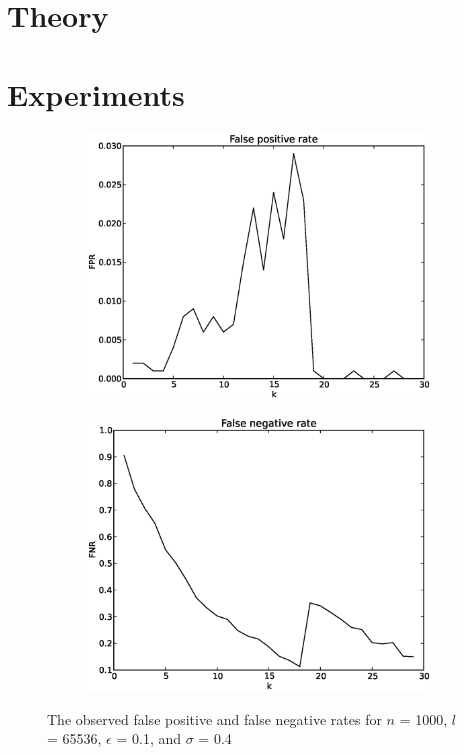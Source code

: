 \documentclass[a4paper,11pt]{article}
\begin{document}
\section{Theory} %




\section{Experiments}
\begin{figure}[H]
\centering
\begin{subfigure}{.5\textwidth}
  \centering
  \includegraphics[width=.95\linewidth]{FPR1}
\end{subfigure}%
\begin{subfigure}{.5\textwidth}
  \centering
  \includegraphics[width=.95\linewidth]{FNR1}
\end{subfigure}
\caption{The observed false positive and false negative rates for $n$ = 1000, $l$ = 65536, $\epsilon$ = 0.1, and $\sigma$ = 0.4}
\label{fig:n1000}
\end{figure}
\end{document}
